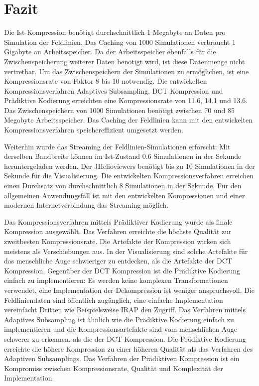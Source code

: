 \section{Fazit}
Die Ist-Kompression benötigt durchschnittlich 1 Megabyte an Daten pro Simulation der Feldlinien. Das Caching von 1000 Simulationen verbraucht 1 Gigabyte an Arbeitsspeicher. Da der Arbeitsspeicher ebenfalls für die Zwischenspeicherung weiterer Daten benötigt wird, ist diese Datenmenge nicht vertretbar. Um das Zwischenspeichern der Simulationen zu ermöglichen, ist eine Kompressionsrate von Faktor 8 bis 10 notwendig. Die entwickelten Kompressionsverfahren Adaptives Subsampling, DCT Kompression und Prädiktive Kodierung erreichten eine Kompressionsrate von 11.6, 14.1 und 13.6. Das Zwischenspeichern von 1000 Simulationen benötigt zwischen 70 und 85 Megabyte Arbeitsspeicher. Das Caching der Feldlinien kann mit den entwickelten Kompressionsverfahren speichereffizient umgesetzt werden.

Weiterhin wurde das Streaming der Feldlinien-Simulationen erforscht: Mit derselben Bandbreite können im Ist-Zustand 0.6 Simulationen in der Sekunde heruntergeladen werden. Der JHelioviewers benötigt bis zu 10 Simulationen in der Sekunde für die Visualisierung. Die entwickelten Kompressionsverfahren erreichen einen Durchsatz von durchschnittlich 8 Simulationen in der Sekunde. Für den allgemeinen Anwendungsfall ist mit den entwickelten Kompressionen und einer modernen Internetverbindung das Streaming möglich.

Das Kompressionsverfahren mittels Prädiktiver Kodierung wurde als finale Kompression ausgewählt. Das Verfahren erreichte die höchste Qualität zur zweitbesten Kompressionsrate. Die Artefakte der Kompression wirken sich meistens als Verschiebungen aus. In der Visualisierung sind solche Artefakte für das menschliche Auge schwieriger zu entdecken, als die Artefakte der DCT Kompression. Gegenüber der DCT Kompression ist die Prädiktive Kodierung einfach zu implementieren: Es werden keine komplexen Transformationen verwendet, eine Implementation der Dekompression ist weniger anspruchsvoll. Die Feldliniendaten sind öffentlich zugänglich, eine einfache Implementation vereinfacht Dritten wie Beispielsweise IRAP \cite{website:irap} den Zugriff. Das Verfahren mittels Adaptives Subsampling ist ähnlich wie die Prädiktive Kodierung einfach zu implementieren und die Kompressionsartefakte sind vom menschlichen Auge schwerer zu erkennen, als die der DCT Kompression. Die Prädiktive Kodierung erreichte die höhere Kompression zu einer höheren Qualität als das Verfahren des Adaptiven Subsamplings. Das Verfahren der Prädiktiven Kompression ist ein Kompromiss zwischen Kompressionsrate, Qualität und Komplexität der Implementation.


